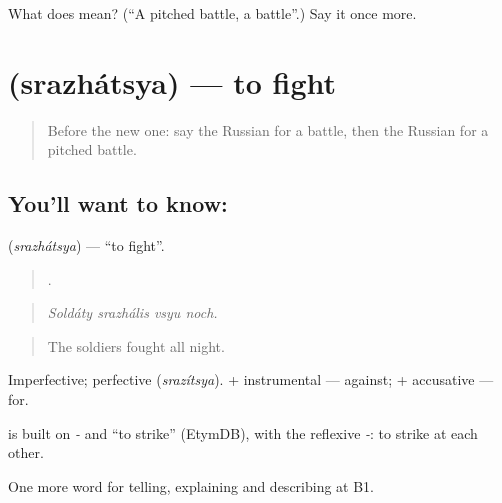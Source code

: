 \begin{tcolorbox}[breakable,colback=teal!4,colframe=teal!35!black,title={Before you move on}]
What does  mean? (\textquotedblleft{}A pitched battle, a battle\textquotedblright{}.) Say it once more.
\end{tcolorbox}
\section[\texorpdfstring{\ru{сражаться} (srazhátsya)}{сражаться (srazhátsya)}]{ (srazhátsya) — to fight}

\label{lesson:RU-C323-srazhatsya}



\begin{quote}
Before the new one: say the Russian for a battle, then the Russian for a pitched battle.
\end{quote}

\subsection*{You'll want to know: }
\textbf{} (\emph{srazhátsya}) — \textquotedblleft{}to fight\textquotedblright{}.

\begin{quote}
   .
\end{quote}

\begin{quote}
\emph{Soldáty srazhális vsyu noch.}
\end{quote}

\begin{quote}
The soldiers fought all night.
\end{quote}

Imperfective; perfective \emph{} (\emph{srazítsya}). \emph{ } + instrumental — against; \emph{} + accusative — for.

\begin{cousinweb}
\emph{} is built on \emph{-} and \emph{} \textquotedblleft{}to strike\textquotedblright{} (EtymDB), with the reflexive \emph{-}: to strike at each other.
\end{cousinweb}

\begin{grammarlens}[title={What you've built}]
One more word for telling, explaining and describing at B1.
\end{grammarlens}

